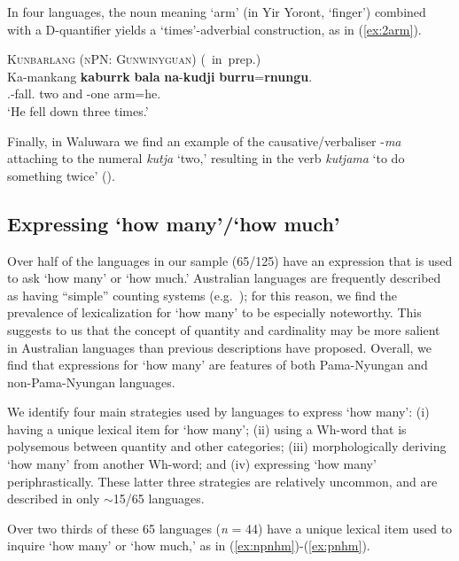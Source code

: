 \documentclass[12pt,egregdoesnotlikesansseriftitles]{scrartcl}
\newcommand{\ofy}{/125} %
\begin{document}
In four languages, the noun meaning `arm' (in Yir Yoront, `finger') combined with a D-quantifier yields a `times'-adverbial construction, as in (\ref{ex:2arm}).
\begin{exe}
  \ex\label{ex:2arm} \textsc{Kunbarlang (nPN: Gunwinyguan)} \hfill (\citeauthor{ikthesis}~in~prep.)\\
  \gll Ka-mankang \textbf{kaburrk} \textbf{bala} \textbf{na}-\textbf{kudji} \textbf{burru}=\textbf{rnungu}.\\
  \Tsg.\Nfut-fall.\Pst{} two and \Cli-one arm=he.\Gen\\
  \glt `He fell down three times.' %
\end{exe}

Finally, in Waluwara we find an example of the causative/verbaliser -\textit{\charis ma} attaching to the numeral \textit{\charis kutja} `two,' resulting in the verb \textit{\charis kutjama} `to do something twice' (\citealt[113]{breen71}).

\subsection{Expressing `how many'/`how much'
\label{sec:howmany}}

Over half of the languages in our sample (65\ofy) have an expression that is used to ask `how many' or `how much.' Australian languages are frequently described as having ``simple'' counting systems (e.g.\ \citealt[67]{dixon02}); for this reason, we find the prevalence  of lexicalization for `how many' to be especially noteworthy. This suggests to us that the concept of quantity and cardinality may be more salient in Australian languages than previous descriptions have proposed. Overall, we find that expressions for `how many' are features of both Pama-Nyungan and non-Pama-Nyungan languages.

We identify four main strategies used by languages to express `how many': (i) having a unique lexical item for `how many'; (ii) using a Wh-word that is polysemous between quantity and other categories; (iii) morphologically deriving `how many' from another Wh-word; and (iv) expressing `how many' periphrastically. These latter three strategies are relatively uncommon, and are described in only $\sim$15/65 languages. 

Over two thirds of these 65 languages (\textit{n} = 44) have a unique lexical item used to inquire `how many' or `how much,' as in (\ref{ex:npnhm})-(\ref{ex:pnhm}). %
\end{document}
